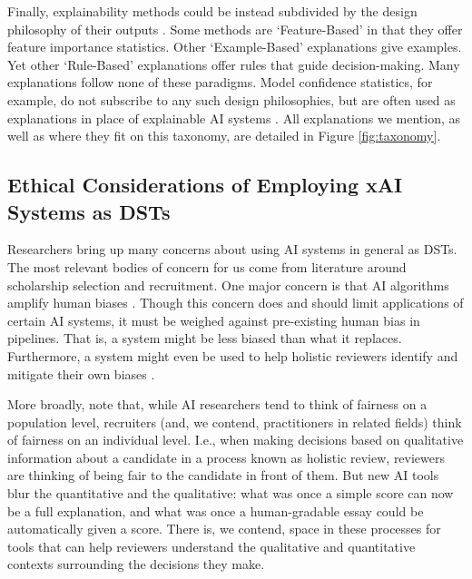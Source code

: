 Finally, explainability methods could be instead subdivided by the design philosophy of their outputs \cite{Friedrich-and-Zanker}. Some methods are `Feature-Based' in that they offer feature importance statistics. Other `Example-Based' explanations give examples. Yet other `Rule-Based' explanations offer rules that guide decision-making. Many explanations follow none of these paradigms. Model confidence statistics, for example, do not subscribe to any such design philosophies, but are often used as explanations in place of explainable AI systems \cite{Zhang-et-al}. All explanations we mention, as well as where they fit on this taxonomy, are detailed in Figure \ref{fig:taxonomy}.

\subsection{Ethical Considerations of Employing xAI Systems as DSTs}
Researchers bring up many concerns about using AI systems in general as DSTs. The most relevant bodies of concern for us come from literature around scholarship selection and recruitment. One major concern is that AI algorithms amplify human biases \cite{MikePerkins_JasperRoe_2023}. Though this concern does and should limit applications of certain AI systems, it must be weighed against pre-existing human bias in pipelines. That is, a system might be less biased than what it replaces. Furthermore, a system might even be used to help holistic reviewers identify and mitigate their own biases \cite{Alvero_Arthurs_antonio_Domingue_Gebre-Medhin_Giebel_Stevens_2020}.

More broadly, \textcite{Alvero_Arthurs_antonio_Domingue_Gebre-Medhin_Giebel_Stevens_2020} note that, while AI researchers tend to think of fairness on a population level, recruiters (and, we contend, practitioners in related fields) think of fairness on an individual level. I.e., when making decisions based on qualitative information about a candidate in a process known as holistic review, reviewers are thinking of being fair to the candidate in front of them. But new AI tools blur the quantitative and the qualitative: what was once a simple score can now be a full explanation, and what was once a human-gradable essay could be automatically given a score. There is, we contend, space in these processes for tools that can help reviewers understand the qualitative and quantitative contexts surrounding the decisions they make.

